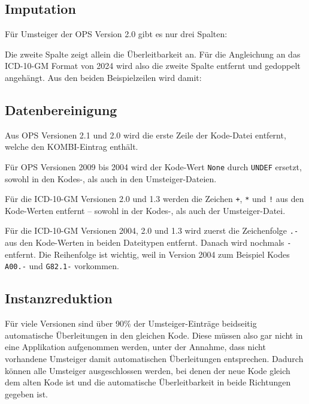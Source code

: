 \newpage

\subsection{Imputation}

Für Umsteiger der OPS Version 2.0 gibt es nur drei Spalten: 


Die zweite Spalte zeigt allein die Überleitbarkeit an. Für die Angleichung an das ICD-10-GM Format von 2024 wird also die zweite Spalte entfernt und gedoppelt angehängt. Aus den beiden Beispielzeilen wird damit:


\subsection{Datenbereinigung}

 Aus OPS Versionen 2.1 und 2.0 wird die erste Zeile der Kode-Datei entfernt, welche den KOMBI-Eintrag enthält. 

 Für OPS Versionen 2009 bis 2004 wird der Kode-Wert \texttt{None} durch \texttt{UNDEF} ersetzt, sowohl in den Kodes-, als auch in den Umsteiger-Dateien. 

 Für die ICD-10-GM Versionen 2.0 und 1.3 werden die Zeichen \texttt{+}, \texttt{*} und \texttt{!} aus den Kode-Werten entfernt -- sowohl in der Kodes-, als auch der Umsteiger-Datei.

 Für die ICD-10-GM Versionen 2004, 2.0 und 1.3 wird zuerst die Zeichenfolge \texttt{.-} aus den Kode-Werten in beiden Dateitypen entfernt. Danach wird nochmals \texttt{-} entfernt. Die Reihenfolge ist wichtig, weil in Version 2004 zum Beispiel Kodes \texttt{A00.-} und \texttt{G82.1-} vorkommen. 

\subsection{Instanzreduktion}
 

Für viele Versionen sind über 90\% der Umsteiger-Einträge beidseitig automatische Überleitungen in den gleichen Kode. Diese müssen also gar nicht in eine Applikation aufgenommen werden, unter der Annahme, dass nicht vorhandene Umsteiger damit automatischen Überleitungen entsprechen. Dadurch können alle Umsteiger ausgeschlossen werden, bei denen der neue Kode gleich dem alten Kode ist und die automatische Überleitbarkeit in beide Richtungen gegeben ist. 


